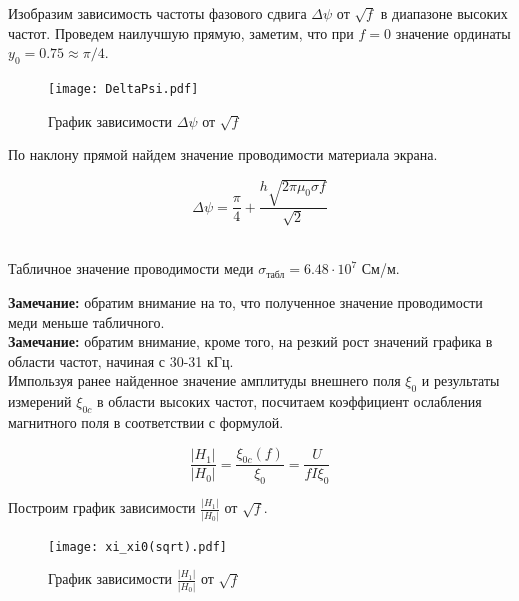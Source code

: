     \begin{center}
    \end{center}

    Изобразим зависимость частоты фазового сдвига $\Delta \psi$ от $\sqrt{f}$ в диапазоне высоких частот.
    Проведем наилучшую прямую, заметим, что при $f = 0$ значение ординаты $y_0 = 0.75 \approx \pi/4$.

    \begin{figure}
        \centering
        \texttt{[image: DeltaPsi.pdf]}
        \caption{График зависимости $\Delta \psi$ от $\sqrt{f}$}
        \label{DeltaPsi}
    \end{figure}

    По наклону прямой найдем значение проводимости материала экрана.

    \begin{equation}
        \Delta \psi = \frac{\pi}{4} + \frac{h \sqrt{2 \pi \mu_0 \sigma f}}{\sqrt{2}}
    \end{equation}

    \begin{center}
         \\
        Табличное значение проводимости меди $\sigma_{\text{табл}} = 6.48 \cdot 10^7$ См/м.
    \end{center}

    \textbf{Замечание:} обратим внимание на то, что полученное значение проводимости меди меньше табличного. %
    \\

    \textbf{Замечание:} обратим внимание, кроме того, на резкий рост значений графика в области частот, начиная с 30-31 кГц. %
    \\

    Импользуя ранее найденное значение амплитуды внешнего поля $\xi_0$ и результаты измерений $\xi_{0c}$
    в области высоких частот, посчитаем коэффициент ослабления магнитного поля в соответствии с формулой.

    \begin{equation}
        \frac{|H_{1}|}{|H_{0}|} = \frac{\xi_{0c}(f)}{\xi_0} = \frac{U}{f I \xi_0}
    \end{equation}

    Построим график зависимости $\frac{|H_{1}|}{|H_{0}|}$ от $\sqrt{f}$.

    \begin{figure}
        \centering
        \texttt{[image: xi\_xi0(sqrt).pdf]}
        \caption{График зависимости $\frac{|H_{1}|}{|H_{0}|}$ от $\sqrt{f}$}
        \label{xi_xi0(sqrt)}
    \end{figure}

